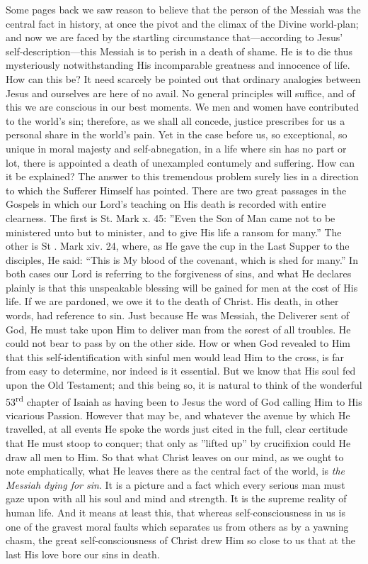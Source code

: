\documentclass[12pt,a5paper,oneside]{book}
\begin{document}
Some pages back we saw reason to believe
that the person of the Messiah was the central
fact in history, at once the pivot and the climax
of the Divine world-plan; and now we are
faced by the startling circumstance that---according 
to Jesus' self-description---this Messiah
is to perish in a death of shame. He is to die
thus mysteriously notwithstanding His incomparable 
greatness and innocence of life. How
can this be? It need scarcely be pointed out
that ordinary analogies between Jesus and
ourselves are here of no avail. No general
principles will suffice, and of this we are conscious
in our best moments. We men and women
have contributed to the world's sin; therefore,
as we shall all concede, justice prescribes for us a
personal share in the world's pain. Yet in the
case before us, so exceptional, so unique in
moral majesty and self-abnegation, in a life
where sin has no part or lot, there is appointed
a death of unexampled contumely and suffering.
How can it be explained? The answer to this
tremendous problem surely lies in a direction to
which the Sufferer Himself has pointed. There
are two great passages in the Gospels in which
our Lord's teaching on His death is recorded
with entire clearness. The first is St. Mark x. 45:
''Even the Son of Man came not to be ministered
unto but to minister, and to give His life a
ransom for many.'' The other is St . Mark xiv. 24,
where, as He gave the cup in the Last Supper
to the disciples, He said: ``This is My blood of
the covenant, which is shed for many.'' In
both cases our Lord is referring to the forgiveness 
of sins, and what He declares plainly is
that this unspeakable blessing will be gained
for men at the cost of His life. If we are pardoned, 
we owe it to the death of Christ. His
death, in other words, had reference to sin. Just
because He was Messiah, the Deliverer sent of
God, He must take upon Him to deliver man from
the sorest of all troubles. He could not bear to
pass by on the other side. How or when God
revealed to Him that this self-identification
with sinful men would lead Him to the cross,
is far from easy to determine, nor indeed is it
essential. But we know that His soul fed upon
the Old Testament; and this being so, it is
natural to think of the wonderful 53\textsuperscript{rd} chapter
of Isaiah as having been to Jesus the word of
God calling Him to His vicarious Passion.
However that may be, and whatever the avenue
by which He travelled, at all events He spoke
the words just cited in the full, clear certitude
that He must stoop to conquer; that only as
''lifted up'' by crucifixion could He draw all
men to Him. So that what Christ leaves on
our mind, as we ought to note emphatically,
what He leaves there as the central fact
of the world, is \textit{the Messiah dying for sin}. It
is a picture and a fact which every serious man
must gaze upon with all his soul and mind and
strength. It is the supreme reality of human
life. And it means at least this, that whereas
self-consciousness in us is one of the gravest
moral faults which separates us from others
as by a yawning chasm, the great self-consciousness 
of Christ drew Him so close to us that
at the last His love bore our sins in death.
\end{document}
